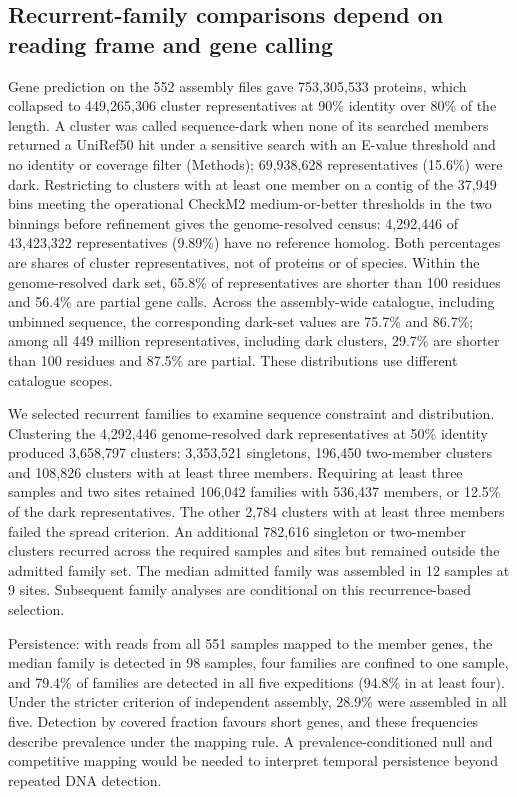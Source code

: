 \documentclass[11pt]{article}
\begin{document}
\subsection*{Recurrent-family comparisons depend on reading frame and gene calling}

Gene prediction on the 552 assembly files gave 753{,}305{,}533 proteins, which collapsed to
449{,}265{,}306 cluster representatives at 90\% identity over 80\% of the length. A cluster was
called sequence-dark when none of its searched members returned a UniRef50 hit under a sensitive
search with an E-value threshold and no identity or coverage filter (Methods); 69{,}938{,}628
representatives (15.6\%) were dark. Restricting to clusters with at least one member on a contig of
the 37{,}949 bins meeting the operational CheckM2 medium-or-better thresholds in the two binnings before refinement gives the
genome-resolved census: 4{,}292{,}446 of 43{,}423{,}322 representatives (9.89\%) have no reference
homolog. Both percentages are shares of cluster representatives, not of
proteins or of species. Within the genome-resolved dark set, 65.8\% of representatives are
shorter than 100 residues and 56.4\% are partial gene calls. Across the assembly-wide catalogue,
including unbinned sequence, the corresponding dark-set values are 75.7\% and 86.7\%; among all
449 million representatives, including dark clusters, 29.7\% are shorter than 100 residues and
87.5\% are partial. These distributions use different catalogue scopes.

We selected recurrent families to examine sequence constraint and distribution. Clustering the
4{,}292{,}446 genome-resolved dark representatives at 50\% identity produced 3{,}658{,}797 clusters:
3{,}353{,}521 singletons, 196{,}450 two-member clusters and 108{,}826 clusters with at least three
members. Requiring at least three samples and two sites retained 106{,}042 families with 536{,}437
members, or 12.5\% of the dark representatives. The other 2{,}784 clusters with at least three
members failed the spread criterion. An additional 782{,}616 singleton or two-member clusters
recurred across the required samples and sites but remained outside the admitted family set.
The median admitted family was assembled in 12 samples at 9 sites. Subsequent family analyses
are conditional on this recurrence-based selection.

Persistence: with reads from all 551 samples mapped to the member genes, the median family is
detected in 98 samples, four families are confined to one sample, and 79.4\% of families are detected
in all five expeditions (94.8\% in at least four). Under the stricter criterion of independent
assembly, 28.9\% were assembled in all five. Detection by covered fraction
favours short genes, and these frequencies describe prevalence under the mapping rule. A prevalence-conditioned null and competitive mapping would be needed to interpret temporal persistence beyond repeated DNA detection.
\end{document}
